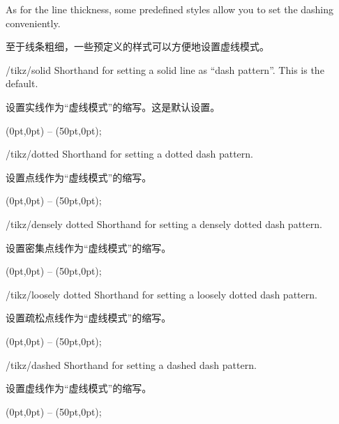 As for the line thickness, some predefined styles allow you to set the dashing
conveniently.

至于线条粗细，一些预定义的样式可以方便地设置虚线模式。

\begin{stylekey}{/tikz/solid}
    Shorthand for setting a solid line as ``dash pattern''. This is the default.
    
    设置实线作为“虚线模式”的缩写。这是默认设置。
%
\begin{codeexample}[]
\tikz \draw[solid] (0pt,0pt) -- (50pt,0pt);
\end{codeexample}
\end{stylekey}

\begin{stylekey}{/tikz/dotted}
    Shorthand for setting a dotted dash pattern.
    
    设置点线作为“虚线模式”的缩写。
%
\begin{codeexample}[]
\tikz \draw[dotted] (0pt,0pt) -- (50pt,0pt);
\end{codeexample}
\end{stylekey}

\begin{stylekey}{/tikz/densely dotted}
    Shorthand for setting a densely dotted dash pattern.
    
    设置密集点线作为“虚线模式”的缩写。
%
\begin{codeexample}[]
\tikz {} (0pt,0pt) -- (50pt,0pt);
\end{codeexample}
\end{stylekey}

\begin{stylekey}{/tikz/loosely dotted}
    Shorthand for setting a loosely dotted dash pattern.
    
    设置疏松点线作为“虚线模式”的缩写。
%
\begin{codeexample}[]
\tikz {} (0pt,0pt) -- (50pt,0pt);
\end{codeexample}
\end{stylekey}

\begin{stylekey}{/tikz/dashed}
    Shorthand for setting a dashed dash pattern.
    
    设置虚线作为“虚线模式”的缩写。
%
\begin{codeexample}[]
\tikz \draw[dashed] (0pt,0pt) -- (50pt,0pt);
\end{codeexample}
\end{stylekey}

